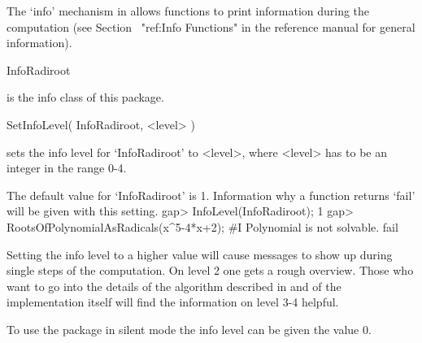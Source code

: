

The `info' mechanism in {\GAP} allows functions to print information
during the computation (see Section ~"ref:Info Functions" in the
{\GAP} reference manual for general information).

\> InfoRadiroot

is the info class of this package.

\> SetInfoLevel( InfoRadiroot, <level> )

sets the info level for `InfoRadiroot' to <level>, where <level> has
to be an integer in the range 0-4.

The default value for `InfoRadiroot' is 1. Information why a function
returns `fail' will be given with this setting.
\beginexample
gap> InfoLevel(InfoRadiroot);
1
gap> RootsOfPolynomialAsRadicals(x^5-4*x+2);
#I  Polynomial is not solvable.
fail
\endexample

Setting the info level to a higher value will cause messages to show up during
single steps of the computation. On level 2 one gets a rough
overview. Those who want to go into the details of the algorithm
described in \cite{Distler05} and of the implementation itself will
find the information on level 3-4 helpful.

To use the package in silent mode the info level can be given the
value 0.
